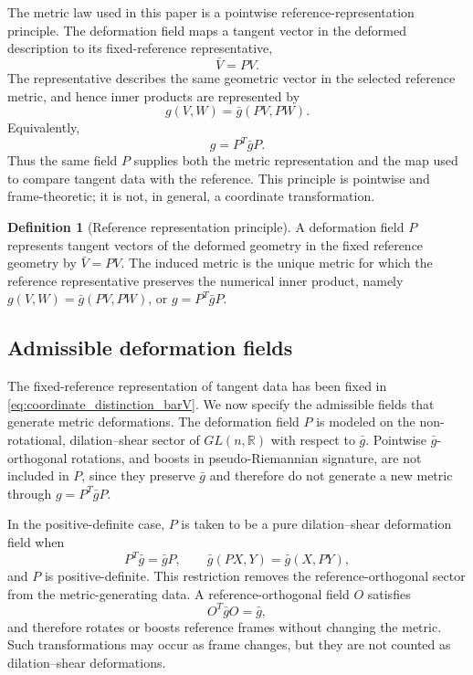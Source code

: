 \documentclass[12pt]{amsart}
\theoremstyle{definition}
\newtheorem{definition}[theorem]{Definition}
\theoremstyle{remark}
\begin{document}
The metric law used in this paper is a pointwise reference-representation principle.  The deformation field maps a tangent vector in the deformed description to its fixed-reference representative,
\begin{equation}\label{eq:reference_representation_principle_barV}
 \bar V=P V .
\end{equation}
The representative describes the same geometric vector in the selected reference metric, and hence inner products are represented by
\begin{equation}\label{eq:reference_representation_principle_inner_product}
 g(V,W)=\bar g(PV,PW).
\end{equation}
Equivalently,
\begin{equation}\label{eq:reference_representation_principle_metric}
 g=P^T\bar g P.
\end{equation}
Thus the same field \(P\) supplies both the metric representation and the map used to compare tangent data with the reference.  This principle is pointwise and frame-theoretic; it is not, in general, a coordinate transformation.

\begin{definition}[Reference representation principle]\label{def:reference_representation_principle}
A deformation field \(P\) represents tangent vectors of the deformed geometry in the fixed reference geometry by \(\bar V=PV\).  The induced metric is the unique metric for which the reference representative preserves the numerical inner product, namely \(g(V,W)=\bar g(PV,PW)\), or \(g=P^T\bar gP\).
\end{definition}

\subsection{Admissible deformation fields}\label{subsec:deformation_field}

The fixed-reference representation of tangent data has been fixed in \eqref{eq:coordinate_distinction_barV}.  We now specify the admissible fields that generate metric deformations.  The deformation field \(P\) is modeled on the non-rotational, dilation--shear sector of \(GL(n,\mathbb R)\) with respect to \(\bar g\).  Pointwise \(\bar g\)-orthogonal rotations, and boosts in pseudo-Riemannian signature, are not included in \(P\), since they preserve \(\bar g\) and therefore do not generate a new metric through \(g=P^T\bar gP\).

In the positive-definite case, \(P\) is taken to be a pure dilation--shear deformation field when
\begin{equation}\label{eq:P_self_adjoint}
 P^{T}\bar g=\bar g P,
 \qquad
 \bar g(PX,Y)=\bar g(X,PY),
\end{equation}
and \(P\) is positive-definite.  This restriction removes the reference-orthogonal sector from the metric-generating data.  A reference-orthogonal field \(O\) satisfies
\begin{equation}
 O^T\bar g O=\bar g,
\end{equation}
and therefore rotates or boosts reference frames without changing the metric.  Such transformations may occur as frame changes, but they are not counted as dilation--shear deformations.
\end{document}
